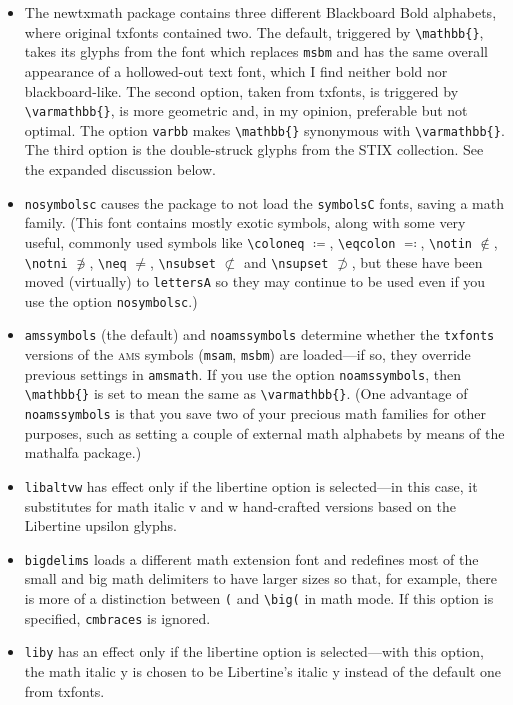 \documentclass[11pt]{article}
\begin{document}
\begin{itemize}
\item The \textsf{newtxmath} package contains three different Blackboard Bold alphabets, where original \textsf{txfonts} contained two. The default, triggered by \verb|\mathbb{}|, takes its glyphs from the font which replaces {\tt msbm} and has the same overall appearance of a hollowed-out text font, which I find neither bold nor blackboard-like. The second option, taken from \textsf{txfonts}, is triggered by \verb|\varmathbb{}|, is more geometric and, in my opinion, preferable but not optimal. The option {\tt varbb} makes \verb|\mathbb{}| synonymous with \verb|\varmathbb{}|. The third option is the double-struck glyphs from the STIX collection. See the expanded discussion below.
\item {\tt nosymbolsc} causes the package to not load the {\tt symbolsC} fonts, saving  a math family. (This font contains mostly exotic symbols, along with some very useful, commonly used symbols like \verb|\coloneq| $\coloneq$, \verb|\eqcolon| $\eqcolon$, \verb|\notin| $\notin$, \verb|\notni| $\notni$, \verb|\neq| $\neq$, \verb|\nsubset| $\nsubset$ and \verb|\nsupset| $\nsupset$, but these have been moved (virtually) to {\tt lettersA} so they may continue to be used even if you use the option {\tt nosymbolsc}.)
\item {\tt amssymbols} (the default) and {\tt noamssymbols} determine whether the {\tt txfonts} versions of the \textsc{ams} symbols ({\tt msam}, {\tt msbm}) are loaded---if so, they override previous settings in {\tt amsmath}. If you use the option {\tt noamssymbols}, then \verb|\mathbb{}| is set to mean the same as \verb|\varmathbb{}|. (One advantage of {\tt noamssymbols} is that you save two of your precious math families for other purposes, such as setting a couple of external math alphabets by means of the \textsf{mathalfa} package.)
\item {\tt libaltvw} has effect only if the libertine option is selected---in this case, it substitutes for math italic v and w hand-crafted versions based on the Libertine upsilon glyphs.
\item{\tt bigdelims} loads a different math extension font and redefines most of the small and big math delimiters to have larger sizes so that, for example, there is more of a distinction between \verb|(| and \verb|\big(| in math mode. If this option is specified, {\tt cmbraces} is ignored.
\item{\tt liby} has an effect only if the libertine option is selected---with this option, the math italic y is chosen to be Libertine's italic y instead of the default one from txfonts.

\end{itemize}
\end{document}
